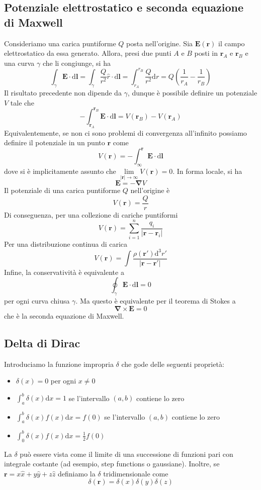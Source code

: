 \documentclass[a4paper,11pt]{book}
\newcommand{\dif}{\mathrm{d}}
\let\oldnabla\nabla
\renewcommand{\nabla}{\vec{\oldnabla}}
\renewcommand{\vec}[1]{\mathbf{#1}}
\theoremstyle{theorem}
\theoremstyle{definition}
\begin{document}
\subsection{Potenziale elettrostatico e seconda equazione di Maxwell}
Consideriamo una carica puntiforme $Q$ posta nell'origine. Sia $\vec{E}(\vec{r})$ il campo elettrostatico da essa generato. Allora, presi due punti $A$ e $B$ posti in $\vec{r}_A$ e $\vec{r}_B$ e una curva $\gamma$ che li congiunge, si ha
\[\int_{\gamma}\vec{E}\cdot\dif\vec{l}=\int_{\gamma}\frac{Q}{r^2}\hat{r}\cdot\dif\vec{l}=\int_{r_A}^{r_B}\frac{Q}{r^2}\dif r=Q\left(\frac{1}{r_A}-\frac{1}{r_B}\right)\]
Il risultato precedente non dipende da $\gamma$, dunque è possibile definire un potenziale $V$ tale che
\[-\int_{\vec{r}_A}^{\vec{r}_B}\vec{E}\cdot\dif\vec{l}=V(\vec{r}_B)-V(\vec{r}_A)\]
Equivalentemente, se non ci sono problemi di convergenza all'infinito possiamo definire il potenziale in un punto $\vec{r}$ come
\[
	V(\vec{r})=-\int_{\infty}^{\vec{r}}\vec{E}\cdot\dif\vec{l}
\]
dove si è implicitamente assunto che $\lim\limits_{|\vec{r}|\to\infty}V(\vec{r})=0$. In forma locale, si ha
\[\vec{E}=-\nabla V\]
Il potenziale di una carica puntiforme $Q$ nell'origine è
\[
V(\vec{r})=\frac{Q}{r}\]
Di conseguenza, per una collezione di cariche puntiformi
\[V(\vec{r})=\sum_{i=1}^{n}\frac{q_i}{|\vec{r}-\vec{r}_i|}\]
Per una distribuzione continua di carica
\[V(\vec{r})=\int\frac{\rho(\vec{r}')\dif^3r'}{|\vec{r}-\vec{r}'|}\]
Infine, la conservatività è equivalente a
\[\oint_\gamma\vec{E}\cdot\dif\vec{l}=0\]
per ogni curva chiusa $\gamma$. Ma questo è equivalente per il teorema di Stokes a
\[\nabla\times\vec{E}=0\]
che è la seconda equazione di Maxwell.
\subsection{Delta di Dirac}
Introduciamo la funzione impropria $\delta$ che gode delle seguenti proprietà:
\begin{itemize}
	\item $\delta(x)=0$ per ogni $x\neq0$
	\item $\int_a^b\delta(x)\dif x=1$ se l'intervallo $(a,b)$ contiene lo zero
	\item $\int_a^b\delta(x)f(x)\dif x=f(0)$ se l'intervallo $(a,b)$ contiene lo zero
	\item $\int_{0}^{b}\delta(x)f(x)\dif x=\frac{1}{2}f(0)$
\end{itemize}
La $\delta$ può essere vista come il limite di una successione di funzioni pari con integrale costante (ad esempio, step functions o gaussiane). Inoltre, se $\vec{r}=x\hat{x}+y\hat{y}+z\hat{z}$ definiamo la $\delta$ tridimensionale come
\[\delta(\vec{r})=\delta(x)\delta(y)\delta(z)\]
\newpage
\end{document}
